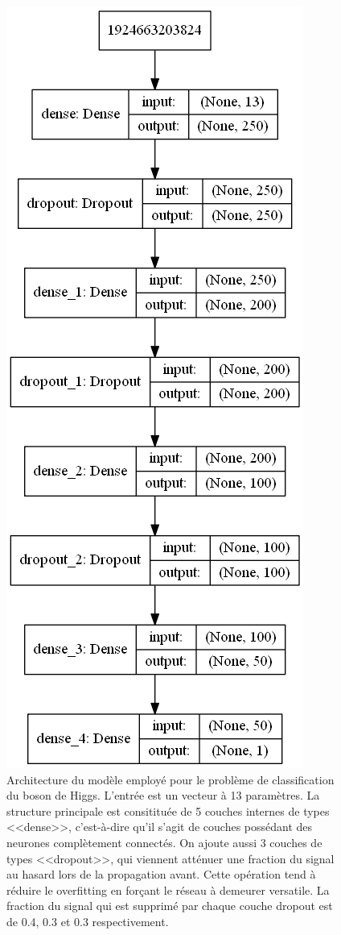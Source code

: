 \documentclass{article}
\begin{document}
\begin{figure}[H]
	\centering
	\includegraphics[scale=0.6]{imgs/model_plot.png}
	\caption{Architecture du modèle employé pour le problème de classification du boson de Higgs. L'entrée est un vecteur à 13 paramètres. La structure principale est consitituée de 5 couches internes de types <<dense>>, c'est-à-dire qu'il s'agit de couches possédant des neurones complètement connectés. On ajoute aussi 3 couches de types <<dropout>>, qui viennent atténuer une fraction du signal au hasard lors de la propagation avant. Cette opération tend à réduire le overfitting en forçant le réseau à demeurer versatile. La fraction du signal qui est supprimé par chaque couche dropout est de 0.4, 0.3 et 0.3 respectivement.}
	\label{fig:model}
\end{figure}
\end{document}
